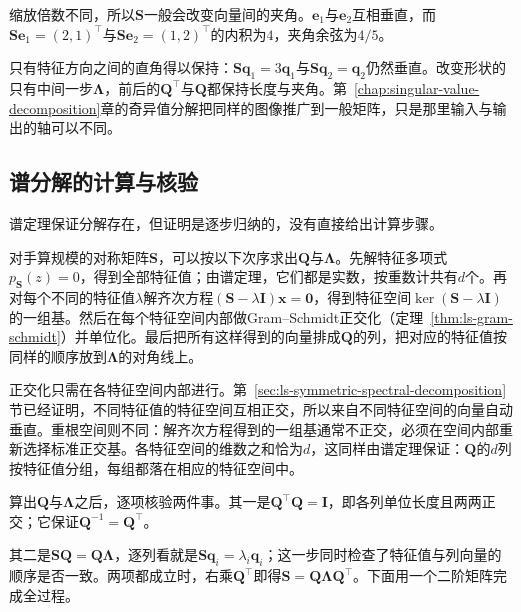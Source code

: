 缩放倍数不同，所以$\bm S$一般会改变向量间的夹角。$\bm e_1$与$\bm e_2$互相垂直，而$\bm S\bm e_1=(2,1)^\top$与$\bm S\bm e_2=(1,2)^\top$的内积为$4$，夹角余弦为$4/5$。

只有特征方向之间的直角得以保持：$\bm S\bm q_1=3\bm q_1$与$\bm S\bm q_2=\bm q_2$仍然垂直。改变形状的只有中间一步$\bm\Lambda$，前后的$\bm Q^\top$与$\bm Q$都保持长度与夹角。第~\ref{chap:singular-value-decomposition}章的奇异值分解把同样的图像推广到一般矩阵，只是那里输入与输出的轴可以不同。

\subsection{谱分解的计算与核验}
\label{sec:ls-spectral-decomposition-computation}

谱定理保证分解存在，但证明是逐步归纳的，没有直接给出计算步骤。

对手算规模的对称矩阵$\bm S$，可以按以下次序求出$\bm Q$与$\bm\Lambda$。先解特征多项式$p_{\bm S}(z)=0$，得到全部特征值；由谱定理，它们都是实数，按重数计共有$d$个。再对每个不同的特征值$\lambda$解齐次方程$(\bm S-\lambda\bm I)\bm x=\bm0$，得到特征空间$\ker(\bm S-\lambda\bm I)$的一组基。然后在每个特征空间内部做Gram--Schmidt正交化（定理~\ref{thm:ls-gram-schmidt}）并单位化。最后把所有这样得到的向量排成$\bm Q$的列，把对应的特征值按同样的顺序放到$\bm\Lambda$的对角线上。

正交化只需在各特征空间内部进行。第~\ref{sec:ls-symmetric-spectral-decomposition}节已经证明，不同特征值的特征空间互相正交，所以来自不同特征空间的向量自动垂直。重根空间则不同：解齐次方程得到的一组基通常不正交，必须在空间内部重新选择标准正交基。各特征空间的维数之和恰为$d$，这同样由谱定理保证：$\bm Q$的$d$列按特征值分组，每组都落在相应的特征空间中。

算出$\bm Q$与$\bm\Lambda$之后，逐项核验两件事。其一是$\bm Q^\top\bm Q=\bm I$，即各列单位长度且两两正交；它保证$\bm Q^{-1}=\bm Q^\top$。

其二是$\bm S\bm Q=\bm Q\bm\Lambda$，逐列看就是$\bm S\bm q_i=\lambda_i\bm q_i$；这一步同时检查了特征值与列向量的顺序是否一致。两项都成立时，右乘$\bm Q^\top$即得$\bm S=\bm Q\bm\Lambda\bm Q^\top$。下面用一个二阶矩阵完成全过程。

